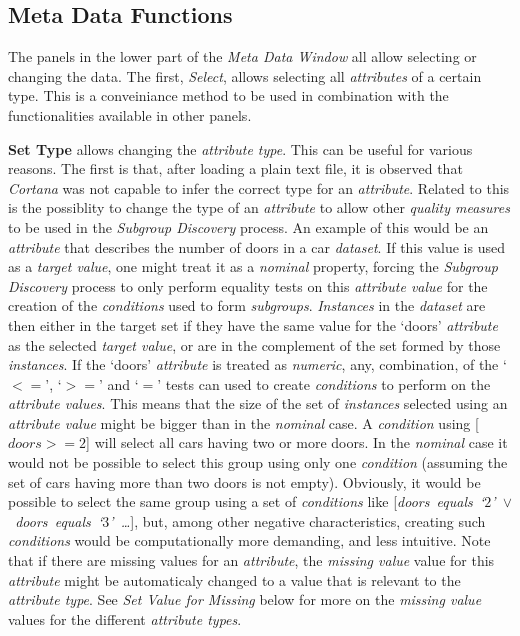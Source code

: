 \documentclass{article}
\begin{document}
\subsection{Meta Data Functions}
\label{meta-data-window:meta-data-functions}
The panels in the lower part of the \emph{Meta Data Window} all allow selecting or changing the data.
The first, \emph{Select}, allows selecting all \emph{attributes} of a certain type.
This is a conveiniance method to be used in combination with the functionalities available in other panels.

\textbf{Set Type} allows changing the \emph{attribute type}.
This can be useful for various reasons.
The first is that, after loading a plain text file, it is observed that \emph{Cortana} was not capable to infer the correct type for an \emph{attribute}.
Related to this is the possiblity to change the type of an \emph{attribute} to allow other \emph{quality measures} to be used in the \emph{Subgroup Discovery} process.
An example of this would be an \emph{attribute} that describes the number of doors in a car \emph{dataset}.
If this value is used as a \emph{target value}, one might treat it as a \emph{nominal} property, forcing the \emph{Subgroup Discovery} process to only perform equality tests on this \emph{attribute value} for the creation of the \emph{conditions} used to form \emph{subgroups}.
\emph{Instances} in the \emph{dataset} are then either in the target set if they have the same value for the `doors' \emph{attribute} as the selected \emph{target value}, or are in the complement of the set formed by those \emph{instances}.
If the `doors' \emph{attribute} is treated as \emph{numeric}, any, combination, of the `$<=$', `$>=$' and `$=$' tests can used to create \emph{conditions} to perform on the \emph{attribute values}.
This means that the size of the set of \emph{instances} selected using an \emph{attribute value} might be bigger than in the \emph{nominal} case.
A \emph{condition} using \mbox{[$doors >= 2$]} will select all cars having two or more doors.
In the \emph{nominal} case it would not be possible to select this group using only one \emph{condition} (assuming the set of cars having more than two doors is not empty).
Obviously, it would be possible to select the same group using a set of \emph{conditions} like \mbox{[\emph{doors equals `$2$' $\vee$ doors equals `$3$' \ldots}]}, but, among other negative characteristics, creating such \emph{conditions} would be computationally more demanding, and less intuitive.
Note that if there are missing values for an \emph{attribute}, the \emph{missing value} value for this \emph{attribute} might be automaticaly changed to a value that is relevant to the \emph{attribute type}.
See \emph{Set Value for Missing} below for more on the \emph{missing value} values for the different \emph{attribute types}.
\end{document}
